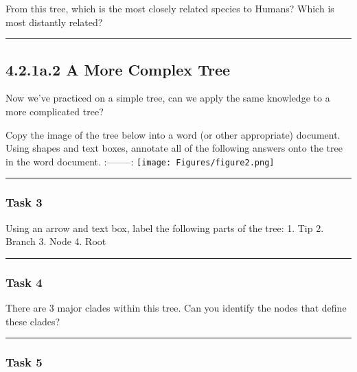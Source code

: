 \documentclass[
]{article}
\begin{document}
From this tree, which is the most closely related species to Humans?
Which is most distantly related?

\begin{center}\rule{0.5\linewidth}{0.5pt}\end{center}

\hypertarget{a.2-a-more-complex-tree}{%
\subsection{4.2.1a.2 A More Complex
Tree}\label{a.2-a-more-complex-tree}}

Now we've practiced on a simple tree, can we apply the same knowledge to
a more complicated tree?

Copy the image of the tree below into a word (or other appropriate)
document. Using shapes and text boxes, annotate all of the following
answers onto the tree in the word document. \textbar:--------:\textbar{}
\texttt{[image: Figures/figure2.png]}

\begin{center}\rule{0.5\linewidth}{0.5pt}\end{center}

\hypertarget{task-3-1}{%
\subsubsection{Task 3}\label{task-3-1}}

Using an arrow and text box, label the following parts of the tree: 1.
Tip 2. Branch 3. Node 4. Root

\begin{center}\rule{0.5\linewidth}{0.5pt}\end{center}

\hypertarget{task-4}{%
\subsubsection{Task 4}\label{task-4}}

There are 3 major clades within this tree. Can you identify the nodes
that define these clades?

\begin{center}\rule{0.5\linewidth}{0.5pt}\end{center}

\hypertarget{task-5}{%
\subsubsection{Task 5}\label{task-5}}
\end{document}
